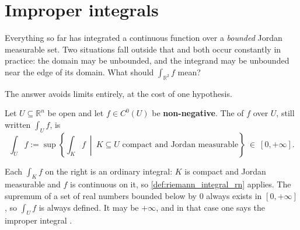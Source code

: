 
\section{Improper integrals}
\label{sec:improper_integrals}

Everything so far has integrated a continuous function over a \emph{bounded} Jordan measurable
set. Two situations fall outside that and both occur constantly in practice: the domain may be
unbounded, and the integrand may be unbounded near the edge of its domain. What should
$\int_{\mathbb{R}^2}f$ mean?

The answer avoids limits entirely, at the cost of one hypothesis.

\begin{definition}
\label{def:improper_integral}
Let $U \subseteq \mathbb{R}^n$ be open and let $f \in C^0(U)$ be \textbf{non-negative}. The
  of $f$ over $U$, still written
$\int_U f$, is
\[\int_U f := \sup\left\{\int_K f \ \middle|\ K \subseteq U \text{ compact and Jordan
  measurable}\right\} \ \in\ [0,+\infty].\]
\end{definition}

Each $\int_K f$ on the right is an ordinary integral: $K$ is compact and Jordan measurable and
$f$ is continuous on it, so \cref{def:riemann_integral_rn} applies. The supremum of a set of
real numbers bounded below by $0$ always exists in $[0,+\infty]$, so $\int_U f$ is always
defined. It may be $+\infty$, and in that case one says the improper integral .

